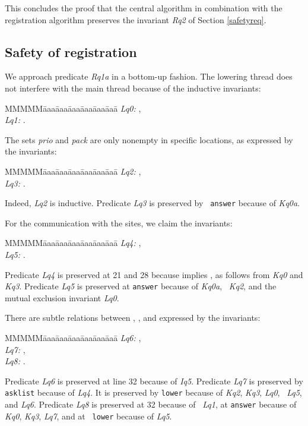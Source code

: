 \documentclass[10pt]{article} \usepackage[english]{babel}
\newenvironment{tab}{\begin{tabbing}
MMMMM\=aaa\=aaa\=aaa\=aaa\=aaa\=aaa\= \kill}{\end{tabbing}}
\def\S #1/{\mbox {\textsl{#1}}}
\def\T #1/{\mbox {\texttt{#1}}}
\begin{document}
This concludes the proof that the central algorithm in combination
with the registration algorithm preserves the invariant \S Rq2/ 
of Section \ref{safetyreq}. 

\subsection {Safety of registration} \label{queryverif}

We approach predicate \S Rq1a/ in a bottom-up fashion.  The lowering
thread does not interfere with the main thread because of the
inductive invariants:
\begin{tab}
  \S Lq0:/ \>  ,\\
  \S Lq1:/ \>  .
\end{tab}
The sets \S prio/ and \S pack/ are only nonempty in specific
locations, as expressed by the invariants:
\begin{tab}
  \S Lq2:/ \>  ,\\
  \S Lq3:/ \>  .
\end{tab}
Indeed, \S Lq2/ is inductive.  Predicate \S Lq3/ is preserved by \T
answer/ because of \S Kq0a/.

For the communication with the sites, we claim the invariants:
\begin{tab}
  \S Lq4:/ \>  ,\\
  \S Lq5:/ \>  .
\end{tab}
Predicate \S Lq4/ is preserved at 21 and 28 because  implies , as follows from \S Kq0/ and \S Kq3/.
Predicate \S Lq5/ is preserved at \T answer/ because of \S Kq0a/, \S
Kq2/, and the mutual exclusion invariant \S Lq0/.

There are subtle relations between , ,
and  expressed by the invariants:
\begin{tab}
  \S Lq6:/ \>  ,\\
  \S Lq7:/ \>  ,\\
  \S Lq8:/ \>  .
\end{tab}
Predicate \S Lq6/ is preserved at line 32 because of \S Iq5/.
Predicate \S Lq7/ is preserved by \T asklist/ because of \S Lq4/.  It
is preserved by \T lower/ because of \S Kq2/, \S Kq3/, \S Lq0/, \S
Lq5/, and \S Lq6/.  Predicate \S Lq8/ is preserved at 32 because of \S
Lq1/, at \T answer/ because of \S Kq0/, \S Kq3/, \S Lq7/, and at \T
lower/ because of \S Lq5/.
\end{document}
